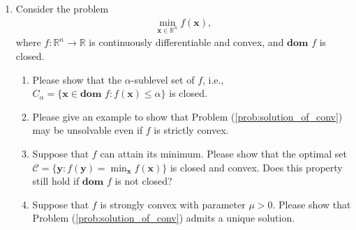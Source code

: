 \documentclass[11pt,letter,notitlepage]{article}
\begin{document}
\begin{exercise}
\begin{enumerate}
    \item Consider the problem
    \begin{align}\label{prob:solution_of_conv}
        \min_{\textbf{x}\in\mathbb{R}^n}f(\mathbf{x}),
    \end{align}
    where $f:\mathbb{R}^n\rightarrow\mathbb{R}$ is  continuously differentiable and convex, and $\textbf{dom } f$ is closed.
    \begin{enumerate}
        \item
        Please show that the $\alpha$-sublevel set of $f$, i.e., $ C_\alpha=\{\mathbf{x}\in\textbf{dom }f:f(\mathbf{x})\leq \alpha\}
        $
        is closed.
        \item
        Please give an example to show that Problem (\ref{prob:solution_of_conv}) may be unsolvable even if $f$ is strictly convex. 
        \item 
        Suppose that $f$ can attain its minimum. Please show that the optimal set $\mathcal{C}=\{ \mathbf{y}:f(\mathbf{y})=\min_{\mathbf{x}} f(\mathbf{x})\}$ is closed and convex. Does this property still hold if $\textbf{dom }f$ is not closed?
        \item
        Suppose that $f$ is strongly convex with parameter $\mu>0$. Please show that Problem (\ref{prob:solution_of_conv}) admits a unique solution.
    \end{enumerate}
\end{enumerate}
    
\end{exercise}

\begin{solution}

\end{solution}
\end{document}

